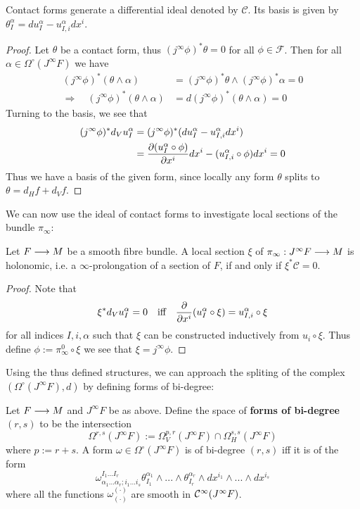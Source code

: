 \begin{theo}
  Contact forms generate a differential ideal denoted by $\mathcal{C}$. Its basis is given by $\theta^\alpha_I = du^\alpha_I - u^\alpha_{I,i} dx^i$.
\begin{proof}
  Let $\theta$ be a contact form, thus $(j^\infty \phi)^* \theta = 0$ for all $\phi \in \mathcal{F}$. Then for all $\alpha \in \Omega^\circ(J^\infty F)$ we have
  \begin{align*}
    (j^\infty \phi)^* (\theta \wedge \alpha) &= (j^\infty \phi)^* \theta \wedge (j^\infty \phi)^* \alpha = 0\\
    \Rightarrow \quad (j^\infty \phi)^* (\theta \wedge \alpha) &= d(j^\infty \phi)^* (\theta \wedge \alpha) = 0
  \end{align*}
  Turning to the basis, we see that
  \begin{align*}
    (j^\infty \phi)^* d_V u^\alpha_I &= (j^\infty \phi)^*(du^\alpha_I - u^\alpha_{I,i} dx^i)\\
    &= \dell{(u^\alpha_I \circ \phi)}{x^i} dx^i - (u^\alpha_{I,i} \circ \phi) dx^i = 0
  \end{align*}
  Thus we have a basis of the given form, since locally any form $\theta$ splits to $\theta = d_H f + d_V f$.
\end{proof}
\end{theo}

We can now use the ideal of contact forms to investigate local sections of the bundle $\pi_\infty$:

\begin{lem}
  Let $F\longrightarrow M$ be a smooth fibre bundle. A local section $\xi$ of $\pi_\infty: J^\infty F \longrightarrow M$ is holonomic, i.e. a $\infty$-prolongation of a section of $F$, if and only if $\xi^* \mathcal{C} = 0$.
\begin{proof}
  Note that
  $$ \xi^* d_V u^\alpha_I = 0 \quad \text{iff} \quad \frac{\partial }{\partial x^i} (u^\alpha_I \circ \xi) = u^\alpha_{I,i} \circ \xi $$
  for all indices $I,i,\alpha$ such that $\xi$ can be constructed inductively from $u_i \circ \xi$. Thus define $\phi := \pi_\infty^0 \circ \xi$ we see that $\xi = j^\infty \phi$.
\end{proof}
\end{lem}

Using the thus defined structures, we can approach the spliting of the complex $(\Omega^\circ(J^\infty F), d)$ by defining forms of bi-degree:

\begin{definition}
  Let $F \longrightarrow M$ and $J^\infty F$ be as above. Define the space of \textbf{forms of bi-degree $(r,s)$} to be the intersection
  $$ \Omega^{r,s}(J^\infty F) := \Omega_V^{p,r}(J^\infty F) \cap \Omega_H^{s,s}(J^\infty F) $$
  where $p:= r+s$. A form $\omega \in \Omega^\circ(J^\infty F)$ is of bi-degree $(r,s)$ iff it is of the form
  $$ \omega^{I_1 ... I_r}_{\alpha_1 ... \alpha_r ; i_1 ... i_s} \theta^{\alpha_1}_{I_1} \wedge ... \wedge \theta^{\alpha_r}_{I_r} \wedge dx^{i_1} \wedge ... \wedge dx^{i_s}$$
  where all the functions $\omega^{(\cdot)}_{(\cdot)}$ are smooth in $\mathcal{C}^{\infty}(J^\infty F)$.
\end{definition}

